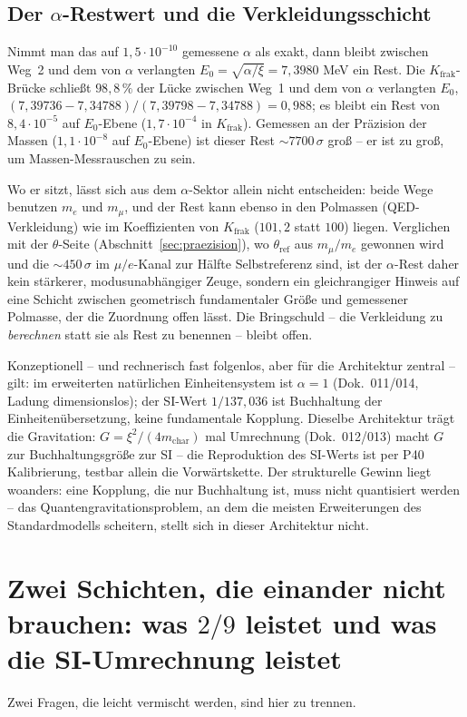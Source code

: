 \subsection{Der $\alpha$-Restwert und die Verkleidungsschicht}
Nimmt man das auf $1{,}5\cdot10^{-10}$ gemessene $\alpha$ als exakt, dann
bleibt zwischen Weg~2 und dem von $\alpha$ verlangten
$E_0=\sqrt{\alpha/\xi}=7{,}3980$ MeV ein Rest. Die $K_{\text{frak}}$-Brücke
schließt $98{,}8\,\%$ der Lücke zwischen Weg~1 und dem von $\alpha$
verlangten $E_0$, $(7{,}39736-7{,}34788)/(7{,}39798-7{,}34788) = 0{,}988$; es
bleibt ein Rest von $8{,}4\cdot10^{-5}$ auf $E_0$-Ebene ($1{,}7\cdot10^{-4}$
in $K_{\text{frak}}$). Gemessen an der Präzision der Massen
($1{,}1\cdot10^{-8}$ auf $E_0$-Ebene) ist dieser Rest $\sim7700\,\sigma$
groß -- er ist zu groß, um Massen-Messrauschen zu sein.

Wo er sitzt, lässt sich aus dem $\alpha$-Sektor allein nicht entscheiden:
beide Wege benutzen $m_e$ und $m_\mu$, und der Rest kann ebenso in den
Polmassen (QED-Verkleidung) wie im Koeffizienten von $K_{\text{frak}}$
($101{,}2$ statt $100$) liegen. Verglichen mit der $\theta$-Seite
(Abschnitt~\ref{sec:praezision}), wo $\theta_{\text{ref}}$ aus $m_\mu/m_e$
gewonnen wird und die $\sim450\,\sigma$ im $\mu/e$-Kanal zur Hälfte
Selbstreferenz sind, ist der $\alpha$-Rest daher kein stärkerer,
modusunabhängiger Zeuge, sondern ein gleichrangiger Hinweis auf eine Schicht
zwischen geometrisch fundamentaler Größe und gemessener Polmasse, der die
Zuordnung offen lässt. Die Bringschuld -- die Verkleidung zu
\emph{berechnen} statt sie als Rest zu benennen -- bleibt offen.

Konzeptionell -- und rechnerisch fast folgenlos, aber für die Architektur
zentral -- gilt: im erweiterten natürlichen Einheitensystem ist
$\alpha=1$ (Dok.~011/014, Ladung dimensionslos); der SI-Wert
$1/137{,}036$ ist Buchhaltung der Einheitenübersetzung, keine
fundamentale Kopplung. Dieselbe Architektur trägt die Gravitation:
$G=\xi^2/(4 m_{\text{char}})$ mal Umrechnung (Dok.~012/013) macht $G$
zur Buchhaltungsgröße zur SI -- die Reproduktion des SI-Werts ist per P40
Kalibrierung, testbar allein die Vorwärtskette. Der strukturelle Gewinn
liegt woanders: eine Kopplung, die nur Buchhaltung ist, muss nicht
quantisiert werden -- das Quantengravitationsproblem, an dem die meisten
Erweiterungen des Standardmodells scheitern, stellt sich in dieser
Architektur nicht.

\section{Zwei Schichten, die einander nicht brauchen: was $2/9$ leistet und was die SI-Umrechnung leistet}
Zwei Fragen, die leicht vermischt werden, sind hier zu trennen.

